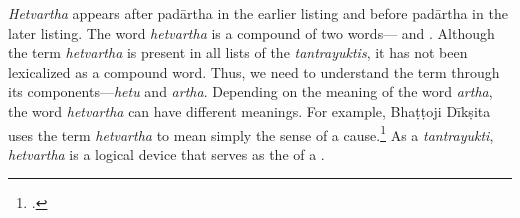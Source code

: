 \emph{Hetvartha} appears after padārtha in the earlier listing 
and before padārtha in the later listing. 
The word \emph{hetvartha} is a compound 
of two words--- and . 
Although the term \emph{hetvartha} is present in all lists of the 
\emph{tantrayuktis}, 
it has not been lexicalized as a compound word. 
Thus, we need to understand the term 
through its components---\emph{hetu} and \emph{artha}. 
Depending on the meaning of the word \emph{artha}, 
the word \emph{hetvartha} can have different meanings. 
For example, Bhaṭṭoji Dīkṣita uses the term \emph{hetvartha} 
to mean simply the sense of a cause.\footnote{%
	 \cite[137]{gada-1904}.} 
As a \emph{tantrayukti}, \emph{hetvartha} is a logical device 
that serves as the  of a . 

